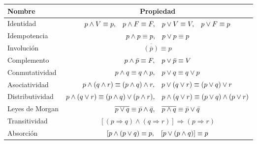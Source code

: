 \begingroup
\setlength{\tabcolsep}{6pt} %
\renewcommand{\arraystretch}{1.5} %
\begin{center}
\begin{tabular}{l|c}
\bf Nombre&\bf Propiedad\\ \hline
Identidad& $p \wedge V \equiv p, \hspace{0.3cm} p \wedge F \equiv F, \hspace{0.3cm} p \vee V \equiv V, \hspace{0.3cm} p \vee F \equiv p  $\\
Idempotencia& $p \wedge p \equiv p,\hspace{0.3cm} p \vee p \equiv p $\\
Involución& $\overline{( {\overline{p}} )} \equiv p$\\
Complemento&$p \wedge \bar{p} \equiv F,\hspace{0.3cm} p \vee \bar{p} \equiv V$\\
Conmutatividad&$ p \wedge q \equiv q \wedge p, \hspace{0.3cm} p \vee q \equiv q \vee p $\\
Asociatividad&$ p \wedge (q \wedge r) \equiv (p \wedge q) \wedge r, \hspace{0.3cm} p \vee (q \vee r) \equiv (p \vee q) \vee r$\\
Distributividad&$p \wedge (q \vee r) \equiv (p \wedge q) \vee (p \wedge r), \hspace{0.3cm}  p \wedge (q \vee r) \equiv (p \vee q) \wedge (p \vee r) $\\
Leyes de Morgan&$\overline{p \vee q} \equiv \bar{p} \wedge \bar{q}, \hspace{0.3cm} \overline{p \wedge q} \equiv \bar{p} \vee \bar{q}$\\
Transitividad&$[(p \Rightarrow q) \wedge (q \Rightarrow r)] \Rightarrow (p \Rightarrow r)$\\
Absorción&$[p \wedge ( p \vee q ) \equiv p, \hspace{0.3cm} [p \vee (p \wedge q)] \equiv p$
\end{tabular}

\end{center}
\endgroup